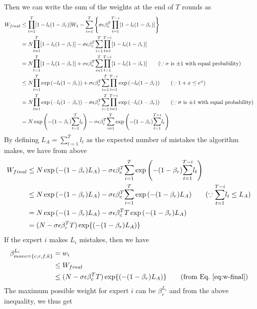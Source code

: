 \documentclass[12pt]{article}
\begin{document}
\noindent Then we can write the sum of the weights at the end of $T$ rounds as
\begin{align*}
W_{final} &\leq\Prod_{t=1}^T[1-l_t(1-\beta_r)]W_1 - \Sum_{i=1}^T\left\{\sigma\epsilon\beta_c^T\Prod_{t=1}^{T-i}[1-l_t(1-\beta_r)]\right\}\\
&=N\Prod_{t=1}^T[1-l_t(1-\beta_r)] - \sigma\epsilon\beta_c^T\Sum_{i=1}^T\Prod_{t=1}^{T-i}[1-l_t(1-\beta_r)]\\
&=N\Prod_{t=1}^T[1-l_t(1-\beta_r)] + \sigma\epsilon\beta_c^T\Sum_{i=1}^T\Prod_{t=1}^{T-i}[1-l_t(1-\beta_r)]\tag{$\because \sigma$ is $\pm1$ with equal probability}\\
&\leq N\Prod_{t=1}^T\exp{\left(-l_t(1-\beta_r)\right)} + \sigma\epsilon\beta_c^T\Sum_{i=1}^T\Prod_{t=1}^{T-i}\exp{\left(-l_t(1-\beta_r)\right)}
\tag{$\because1+x\leq e^x$}\\
&= N\Prod_{t=1}^T\exp{\left(-l_t(1-\beta_r)\right)} - \sigma\epsilon\beta_c^T\Sum_{i=1}^T\Prod_{t=1}^{T-i}\exp{\left(-l_t(1-\beta_r)\right)}
\tag{$\because \sigma$ is $\pm1$ with equal probability}\\
&= N\exp{\left(-(1-\beta_r)\Sum_{t=1}^Tl_t\right)} - \sigma\epsilon\beta_c^T\Sum_{i=1}^T\exp{\left(-(1-\beta_r)\Sum_{t=1}^{T-i}l_t\right)}
\end{align*}
\noindent By defining $L_A=\sum_{t=1}^Tl_t$ as the expected number of mistakes the algorithm makes, we have from above
\begin{align}
W_{final} &\leq N\exp{\left(-(1-\beta_r)L_A\right)} - \sigma\epsilon\beta_c^T\Sum_{i=1}^T\exp{\left(-(1-\beta_r)\Sum_{t=1}^{T-i}l_t\right)}\tag*{}\\
&\leq N\exp{\left(-(1-\beta_r)L_A\right)} - \sigma\epsilon\beta_c^T\Sum_{i=1}^T\exp{\left(-(1-\beta_r)L_A\right)}
\tag{$\because\Sum_{t=1}^{T-i}l_t\leq L_A$}\\
&= N\exp{\left(-(1-\beta_r)L_A\right)} - \sigma\epsilon\beta_c^TT\exp{\left(-(1-\beta_r)L_A\right)}\tag*{}\\
&= (N - \sigma\epsilon\beta_c^TT)\exp\{\left(-(1-\beta_r)L_A\right)\}
\label{eq:w-final}
\end{align}
\noindent If the expert $i$ makes $L_i$ mistakes, then we have
\begin{align*}
\beta_{move=\{c,r,f,k\}}^{L_i} &= w_i\\
&\leq W_{final}\\
&\leq (N - \sigma\epsilon\beta_c^TT)\exp\{\left(-(1-\beta_r)L_A\right)\}\tag{from Eq.~\ref{eq:w-final}}
\end{align*}
\noindent The maximum possible weight for expert $i$ can be $\beta_r^{L_i}$ and from the above inequality, we thus get
\end{document}
